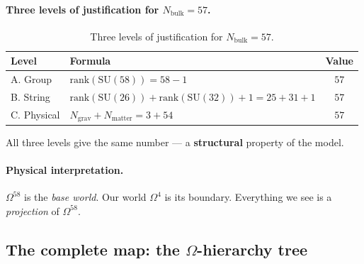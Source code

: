 \documentclass[11pt,a4paper]{article}
\newcommand{\SU}{\mathrm{SU}}
\newcommand{\rank}{\mathrm{rank}}
\newcommand{\Om}{\Omega^4}
\newcommand{\Omfi}{\Omega^{58}}
\newcommand{\Nbulk}{N_{\text{bulk}}}
\theoremstyle{definition}
\begin{document}
\paragraph{Three levels of justification for \texorpdfstring{$\Nbulk = 57$}{N\_bulk = 57}.}

\begin{table}[htbp]
\centering
\caption{Three levels of justification for $\Nbulk = 57$.}
\label{tab:three-levels-nbulk}
\begin{tabular}{llc}
\toprule
Level & Formula & Value \\
\midrule
A. Group & $\rank(\SU(58)) = 58 - 1$ & $57$ \\[0.3em]
B. String & $\rank(\SU(26)) + \rank(\SU(32)) + 1 = 25 + 31 + 1$ & $57$ \\[0.3em]
C. Physical & $N_{\text{grav}} + N_{\text{matter}} = 3 + 54$ & $57$ \\
\bottomrule
\end{tabular}
\end{table}

\noindent
All three levels give the same number — a \textbf{structural} property of the model.

\paragraph{Physical interpretation.}
$\Omfi$ is the \emph{base world}. Our world $\Om$ is its boundary. 
Everything we see is a \emph{projection} of $\Omfi$.

\subsection{The complete map: the $\Omega$-hierarchy tree}
\label{subsec:full-map}
\end{document}

